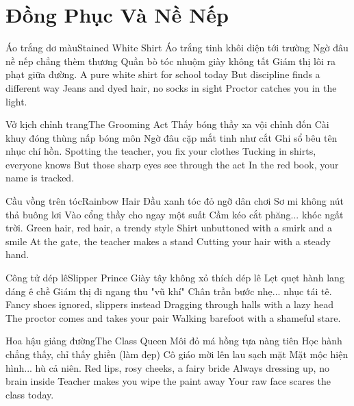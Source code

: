 \chapter{Đồng Phục Và Nề Nếp}

\begin{tutuyetbox}{Áo trắng dơ màu}{Stained White Shirt}
Áo trắng tinh khôi diện tới trường
Ngờ đâu nề nếp chẳng thèm thương
Quần bò tóc nhuộm giày không tất
Giám thị lôi ra phạt giữa đường.
\tcblower
A pure white shirt for school today 
But discipline finds a different way 
Jeans and dyed hair, no socks in sight 
Proctor catches you in the light.
\end{tutuyetbox}

\begin{tutuyetbox}{Vở kịch chỉnh trang}{The Grooming Act}
Thấy bóng thầy xa vội chỉnh đốn
Cài khuy đóng thùng nấp bóng môn
Ngờ đâu cặp mắt tinh như cắt
Ghi sổ bêu tên nhục chí hồn.
\tcblower
Spotting the teacher, you fix your clothes 
Tucking in shirts, everyone knows 
But those sharp eyes see through the act 
In the red book, your name is tracked.
\end{tutuyetbox}

\begin{tutuyetbox}{Cầu vồng trên tóc}{Rainbow Hair}
Đầu xanh tóc đỏ ngỡ dân chơi
Sơ mi không nút thả buông lơi
Vào cổng thầy cho ngay một suất
Cầm kéo cắt phăng... khóc ngất trời.
\tcblower
Green hair, red hair, a trendy style
Shirt unbuttoned with a smirk and a smile
At the gate, the teacher makes a stand
Cutting your hair with a steady hand.
\end{tutuyetbox}

\begin{tutuyetbox}{Công tử dép lê}{Slipper Prince}
Giày tây không xỏ thích dép lê
Lẹt quẹt hành lang dáng ê chề
Giám thị đi ngang thu "vũ khí"
Chân trần bước nhẹ... nhục tái tê.
\tcblower
Fancy shoes ignored, slippers instead
Dragging through halls with a lazy head
The proctor comes and takes your pair
Walking barefoot with a shameful stare.
\end{tutuyetbox}

\begin{tutuyetbox}{Hoa hậu giảng đường}{The Class Queen}
Môi đỏ má hồng tựa nàng tiên
Học hành chẳng thấy, chỉ thấy ghiền (làm đẹp)
Cô giáo mời lên lau sạch mặt
Mặt mộc hiện hình... hù cả niên.
\tcblower
Red lips, rosy cheeks, a fairy bride
Always dressing up, no brain inside
Teacher makes you wipe the paint away
Your raw face scares the class today.
\end{tutuyetbox}

